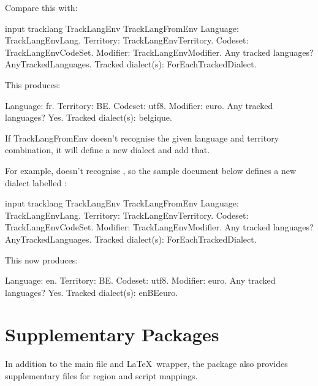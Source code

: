 \documentclass[titlepage=false,oneside,
 fontsize=12pt,captions=tableheading]{scrbook}
\begin{document}
Compare this with:
\begin{codebox}
\gls{input} tracklang
\codepar
{}\gls{TrackLangEnv}
\codepar
\gls{TrackLangFromEnv}
\codepar
Language: \gls{TrackLangEnvLang}.
Territory: \gls{TrackLangEnvTerritory}.
Codeset: \gls{TrackLangEnvCodeSet}.
Modifier: \gls{TrackLangEnvModifier}.
Any tracked languages? \gls{AnyTrackedLanguages}.
Tracked dialect(s):\comment{}
\gls{ForEachTrackedDialect}.
\end{codebox}
This produces:

\begin{resultbox}
Language: fr. Territory: BE.  Codeset: utf8.  Modifier: euro.
Any tracked languages? Yes.
Tracked dialect(s): belgique.
\end{resultbox}

If \gls{TrackLangFromEnv} doesn't recognise the given language and
territory combination, it will define a new dialect and add that.

For example,  doesn't recognise , so
the sample document below defines a new dialect labelled
:
\begin{codebox}
\gls{input} tracklang
\codepar
{}\gls{TrackLangEnv}
\codepar
\gls{TrackLangFromEnv}
\codepar
Language: \gls{TrackLangEnvLang}.
Territory: \gls{TrackLangEnvTerritory}.
Codeset: \gls{TrackLangEnvCodeSet}.
Modifier: \gls{TrackLangEnvModifier}.
Any tracked languages? \gls{AnyTrackedLanguages}.
Tracked dialect(s):\comment{}
\gls{ForEachTrackedDialect}.
\end{codebox}
This now produces:
\begin{resultbox}
Language: en. Territory: BE.  Codeset: utf8.  Modifier: euro.
Any tracked languages? Yes.
Tracked dialect(s): enBEeuro.
\end{resultbox}

\chapter{Supplementary Packages}
\label{sec:supplpkgs}

In addition to the main  file and
 \LaTeX\ wrapper, the  package
also provides supplementary files for region and script mappings.
\end{document}
